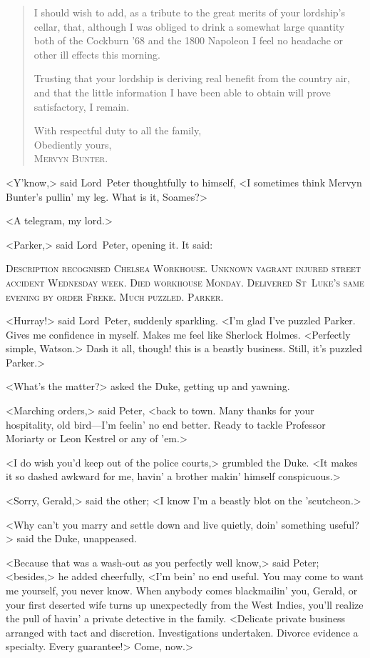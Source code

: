 \begin{quotation}
I should wish to add, as a tribute to the great merits of your lordship's cellar, that, although I was obliged to drink a somewhat large quantity both of the Cockburn '68 and the 1800 Napoleon I feel no headache or other ill effects this morning.

Trusting that your lordship is deriving real benefit from the country air, and that the little information I have been able to obtain will prove satisfactory, I remain.


\begin{flushright}
With respectful duty to all the family,\\
Obediently yours,\\
\textsc{Mervyn Bunter.}
\end{flushright}
\end{quotation}

<Y'know,> said Lord~Peter thoughtfully to himself, <I sometimes think Mervyn Bunter's pullin' my leg. What is it, Soames?>

<A telegram, my lord.>

<Parker,> said Lord~Peter, opening it. It said:

\textsc{Description recognised Chelsea Workhouse. Unknown vagrant injured street accident Wednesday week. Died workhouse Monday. Delivered St~Luke's same evening by order Freke. Much puzzled. Parker.}

<Hurray!> said Lord~Peter, suddenly sparkling. <I'm glad I've puzzled Parker. Gives me confidence in myself. Makes me feel like Sherlock Holmes. <Perfectly simple, Watson.> Dash it all, though! this is a beastly business. Still, it's puzzled Parker.>

<What's the matter?> asked the Duke, getting up and yawning.

<Marching orders,> said Peter, <back to town. Many thanks for your hospitality, old bird—I'm feelin' no end better. Ready to tackle Professor Moriarty or Leon Kestrel or any of 'em.>

<I do wish you'd keep out of the police courts,> grumbled the Duke. <It makes it so dashed awkward for me, havin' a brother makin' himself conspicuous.>

<Sorry, Gerald,> said the other; <I know I'm a beastly blot on the 'scutcheon.>

<Why can't you marry and settle down and live quietly, doin' something useful?> said the Duke, unappeased.

<Because that was a wash-out as you perfectly well know,> said Peter; <besides,> he added cheerfully, <I'm bein' no end useful. You may come to want me yourself, you never know. When anybody comes blackmailin' you, Gerald, or your first deserted wife turns up unexpectedly from the West Indies, you'll realize the pull of havin' a private detective in the family. <Delicate private business arranged with tact and discretion. Investigations undertaken. Divorce evidence a specialty. Every guarantee!> Come, now.>

